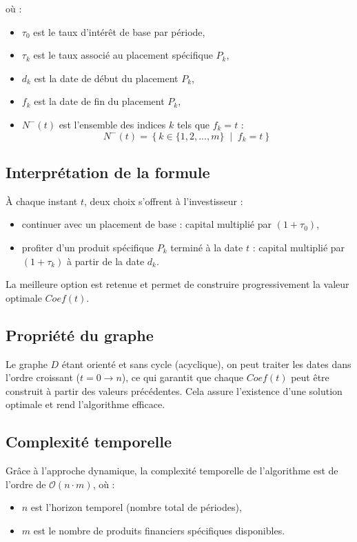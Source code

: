 \documentclass[a4paper,11pt]{article}
\begin{document}
où :

\begin{itemize}
    \item $\tau_0$ est le taux d’intérêt de base par période,
    \item $\tau_k$ est le taux associé au placement spécifique $P_k$,
    \item $d_k$ est la date de début du placement $P_k$,
    \item $f_k$ est la date de fin du placement $P_k$,
    \item $N^-(t)$ est l’ensemble des indices $k$ tels que $f_k = t$ :
    \[
    N^-(t) = \left\{ k \in \{1, 2, ..., m\} \;\middle|\; f_k = t \right\}
    \]
\end{itemize}





\subsection{Interprétation de la formule}

À chaque instant $t$, deux choix s’offrent à l’investisseur :
\begin{itemize}
    \item continuer avec un placement de base : capital multiplié par $(1 + \tau_0)$,
    \item profiter d’un produit spécifique $P_k$ terminé à la date $t$ : capital multiplié par $(1 + \tau_k)$ à partir de la date $d_k$.
\end{itemize}

La meilleure option est retenue et permet de construire progressivement la valeur optimale $Coef(t)$.

\subsection{Propriété du graphe}

Le graphe $D$ étant orienté et sans cycle (acyclique), on peut traiter les dates dans l’ordre croissant ($t = 0 \to n$), ce qui garantit que chaque $Coef(t)$ peut être construit à partir des valeurs précédentes. Cela assure l’existence d’une solution optimale et rend l’algorithme efficace.

    \subsection{Complexité temporelle}

    Grâce à l’approche dynamique, la complexité temporelle de l’algorithme est de l’ordre de $\mathcal{O}(n \cdot m)$, où :
    \begin{itemize}
        \item $n$ est l’horizon temporel (nombre total de périodes),
        \item $m$ est le nombre de produits financiers spécifiques disponibles.
    \end{itemize}
\end{document}
